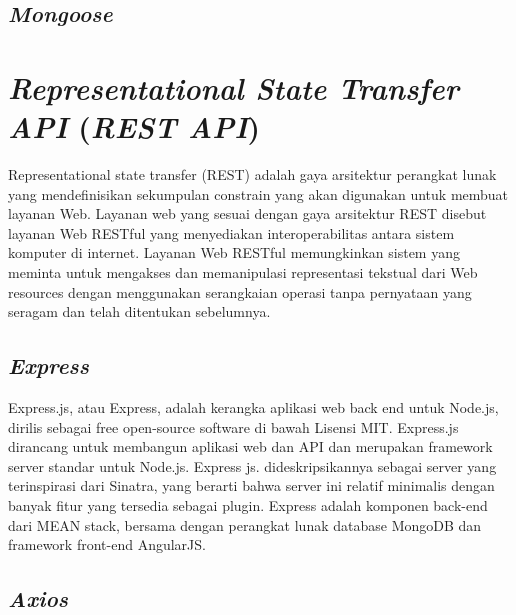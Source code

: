 \subsection{\emph{Mongoose}}
\vspace{1ex}

\lipsum[4]
\vspace{0.5ex}

\section{\emph{Representational State Transfer API} (\emph{REST API})}
\vspace{1ex}
Representational state transfer (REST) adalah gaya arsitektur perangkat lunak yang mendefinisikan sekumpulan constrain
yang akan digunakan untuk membuat layanan Web. Layanan web yang sesuai dengan gaya arsitektur REST disebut 
layanan Web RESTful yang menyediakan interoperabilitas antara sistem komputer di internet. Layanan Web RESTful 
memungkinkan sistem yang meminta untuk mengakses dan memanipulasi representasi tekstual dari Web resources
dengan menggunakan serangkaian operasi tanpa pernyataan yang seragam dan telah ditentukan sebelumnya.

\lipsum[5]
\vspace{0.5ex}

\subsection{\emph{Express}}
\vspace{1ex}
Express.js, atau Express, adalah kerangka aplikasi web back end untuk Node.js, dirilis sebagai free open-source 
software di bawah Lisensi MIT. Express.js dirancang untuk membangun aplikasi web dan API dan merupakan 
framework server standar untuk Node.js. Express js. dideskripsikannya sebagai server yang terinspirasi dari Sinatra, 
yang berarti bahwa server ini relatif minimalis dengan banyak fitur yang tersedia sebagai plugin. Express adalah 
komponen back-end dari MEAN stack, bersama dengan perangkat lunak database MongoDB dan framework front-end AngularJS.
\vspace{0.5ex}

\subsection{\emph{Axios}}
\vspace{1ex}

\lipsum[7]
\vspace{0.5ex}


